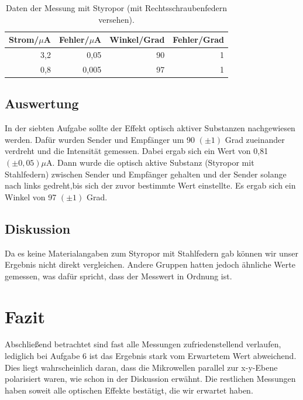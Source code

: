 \documentclass[12pt]{scrartcl}
\begin{document}
\begin{table}[H]
\caption{Daten der Messung mit Styropor (mit Rechtsschraubenfedern versehen).}
\centering
\begin{tabular}{|r|r|r|r|}
\hline
\multicolumn{1}{|l|}{Strom/$\mu$A} & \multicolumn{1}{c|}{Fehler/$\mu$A} & \multicolumn{1}{l|}{Winkel/Grad} & \multicolumn{1}{l|}{Fehler/Grad} \\ \hline
3,2 & 0,05 & 90 & 1 \\ \hline
0,8 & 0,005 & 97 & 1 \\ \hline
\end{tabular}
\label{tab:a_7_m}
\end{table}
\subsection{Auswertung}
In der siebten Aufgabe sollte der Effekt optisch aktiver Substanzen nachgewiesen werden. Dafür wurden Sender und Empfänger um 90 $(\pm 1)$ Grad zueinander verdreht und die Intensität gemessen. Dabei ergab sich ein Wert von 0,81 $(\pm 0,05) \mu$A.  Dann wurde die optisch aktive Substanz (Styropor mit Stahlfedern) zwischen Sender und Empfänger gehalten und der Sender solange nach links gedreht,bis sich der zuvor bestimmte Wert einstellte. Es ergab sich ein Winkel von 97 $(\pm 1)$ Grad.
\subsection{Diskussion}
Da es keine Materialangaben zum Styropor mit Stahlfedern gab können wir unser Ergebnis nicht direkt vergleichen. Andere Gruppen hatten jedoch ähnliche Werte gemessen, was dafür spricht, dass der Messwert in Ordnung ist.
\section{Fazit}
Abschließend betrachtet sind fast alle Messungen zufriedenstellend verlaufen, lediglich bei Aufgabe 6 ist das Ergebnis stark vom Erwartetem Wert abweichend. Dies liegt wahrscheinlich daran, dass die Mikrowellen parallel zur x-y-Ebene  polarisiert waren, wie schon in der Diskussion erwähnt.
Die restlichen Messungen haben soweit alle optischen Effekte bestätigt, die wir erwartet haben.

\end{document}
